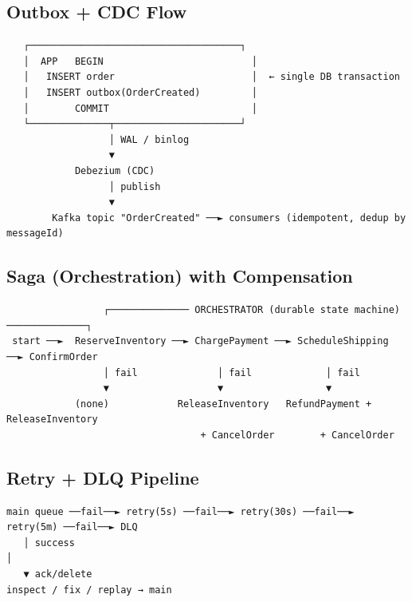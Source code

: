 \documentclass[11pt]{article}
\begin{document}
\subsection{Outbox + CDC Flow}\label{outbox--cdc-flow}

\setcodelang{}

\begin{verbatim}
   ┌─────────────────────────────────────┐
   │  APP   BEGIN                          │
   │   INSERT order                        │  ← single DB transaction
   │   INSERT outbox(OrderCreated)         │
   │        COMMIT                         │
   └──────────────┬──────────────────────┘
                  │ WAL / binlog
                  ▼
            Debezium (CDC)
                  │ publish
                  ▼
        Kafka topic "OrderCreated" ──► consumers (idempotent, dedup by messageId)
\end{verbatim}

\subsection{Saga (Orchestration) with Compensation}\label{saga-orchestration-with-compensation}

\setcodelang{}

\begin{verbatim}
                 ┌────────────── ORCHESTRATOR (durable state machine) ──────────────┐
 start ──►  ReserveInventory ──► ChargePayment ──► ScheduleShipping ──► ConfirmOrder
                 │ fail              │ fail             │ fail
                 ▼                   ▼                  ▼
            (none)            ReleaseInventory   RefundPayment + ReleaseInventory
                                  + CancelOrder        + CancelOrder
\end{verbatim}

\subsection{Retry + DLQ Pipeline}\label{retry--dlq-pipeline}

\setcodelang{}

\begin{verbatim}
main queue ──fail──► retry(5s) ──fail──► retry(30s) ──fail──► retry(5m) ──fail──► DLQ
   │ success                                                                       │
   ▼ ack/delete                                                          inspect / fix / replay → main
\end{verbatim}
\end{document}
